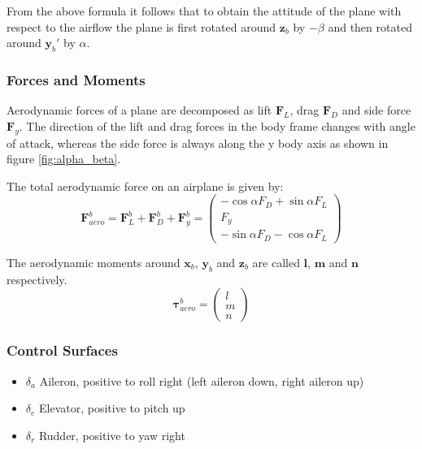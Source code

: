 \documentclass[a4paper]{paper}
\begin{document}
From the above formula it follows that to obtain the attitude of the plane with respect to the airflow the plane is first rotated around $\bm{z}_b$ by $-\beta$ and then rotated around $\bm{y}_b'$ by $\alpha$.


\subsubsection{Forces and Moments}

Aerodynamic forces of a plane are decomposed as lift $\bm F_L$, drag $\bm F_D$ and side force $\bm F_y$. The direction of the lift and drag forces in the body frame changes with angle of attack, whereas the side force is always along the y body axis as shown in figure \ref{fig:alpha_beta}.

The total aerodynamic force on an airplane is given by:
\begin{equation}
    \bm F_{aero}^b = \bm F^b_L + \bm F^b_D + \bm F^b_y = \left(\begin{matrix}
        - \cos\alpha F_D + \sin\alpha F_L\\
        F_y\\
        - \sin\alpha F_D - \cos\alpha F_L
    \end{matrix}\right)
\end{equation}

The aerodynamic moments around $\bm x_b$, $\bm y_b$ and $\bm z_b$ are called $\bm l$, $\bm m$ and $\bm n$ respectively.
\begin{equation}
    \bm \tau_{aero}^b = \left(\begin{matrix}
    l\\ m \\ n
    \end{matrix}\right)
\end{equation}

\subsubsection{Control Surfaces}

\begin{itemize}
    \item $\delta_a$ Aileron, positive to roll right (left aileron down, right aileron up)
    \item $\delta_e$ Elevator, positive to pitch up
    \item $\delta_r$ Rudder, positive to yaw right
\end{itemize}
\end{document}
